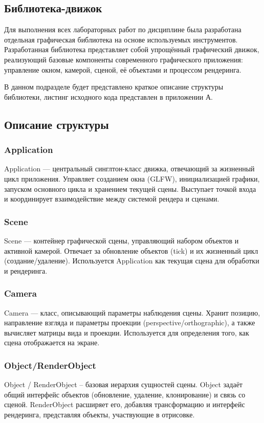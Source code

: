 \documentclass[a4paper,12pt]{article}
\begin{document}
\subsection{Библиотека-движок}
Для выполнения всех лабораторных работ по дисциплине была разработана отдельная графическая библиотека на основе используемых инструментов.
Разработанная библиотека представляет собой упрощённый графический движок,
реализующий базовые компоненты современного графического приложения: управление окном,
камерой, сценой, её объектами и процессом рендеринга.

В данном подразделе будет представлено краткое описание структуры библиотеки, листинг исходного кода представлен в приложении А.

\subsection*{Описание структуры}
\subsubsection*{Application}
Application — центральный синглтон-класс движка, отвечающий за жизненный цикл приложения. Управляет созданием окна (GLFW), инициализацией графики, запуском основного цикла и хранением текущей сцены. Выступает точкой входа и координирует взаимодействие между системой рендера и сценами.

\subsubsection*{Scene}
Scene — контейнер графической сцены, управляющий набором объектов и активной камерой. Отвечает за обновление объектов (tick) и их жизненный цикл (создание/удаление). Используется Application как текущая сцена для обработки и рендеринга.

\subsubsection*{Camera}
Camera — класс, описывающий параметры наблюдения сцены. Хранит позицию, направление взгляда и параметры проекции (perspective/orthographic), а также вычисляет матрицы вида и проекции. Используется для определения того, как сцена отображается на экране.

\subsubsection*{Object/RenderObject}
Object / RenderObject -- базовая иерархия сущностей сцены.
Object задаёт общий интерфейс объектов (обновление, удаление, клонирование) и связь со сценой.
RenderObject расширяет его, добавляя трансформацию и интерфейс рендеринга, представляя объекты, участвующие в отрисовке.
\end{document}

